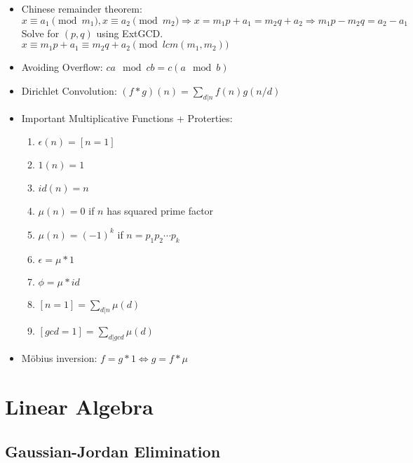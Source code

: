 \documentclass[a4paper,10pt,twocolumn,oneside]{article}
\begin{document}
{\begin{itemize}
    \item Chinese remainder theorem:\\
    $x \equiv a_1 \pmod{m_1}, x \equiv a_2 \pmod{m_2} \Rightarrow x = m_1 p + a_1 = m_2 q + a_2 \Rightarrow m_1 p - m_2 q = a_2 - a_1$\\
    Solve for $(p, q)$ using ExtGCD.\\
    $x \equiv m_1 p + a_1 \equiv m_2 q + a_2 \pmod{lcm(m_1, m_2)}$
    
    \item Avoiding Overflow:
    $ca \mod cb = c(a \mod b)$
    
    \item Dirichlet Convolution: $(f * g)(n) = \sum_{d|n} f(n)g(n/d)$
    
    \item Important Multiplicative Functions + Proterties:
    \begin{enumerate}[nolistsep]
        \item $\epsilon(n) = [n = 1]$
        \item $1(n) = 1$
        \item $id(n) = n$
        \item $\mu(n) = 0$ if $n$ has squared prime factor
        \item $\mu(n) = (-1)^k$ if $n = p_1 p_2 \cdots p_k$
        \item $\epsilon = \mu * 1$
        \item $\phi = \mu * id$
        \item $[n=1] = \sum_{d|n} \mu(d)$
        \item $[gcd=1] = \sum_{d|gcd} \mu(d)$
    \end{enumerate}
    
    \item Möbius inversion:
    $f = g * 1 \Leftrightarrow g = f * \mu$
\end{itemize}}

\section{Linear Algebra}

\subsection{Gaussian-Jordan Elimination}

\end{document}
